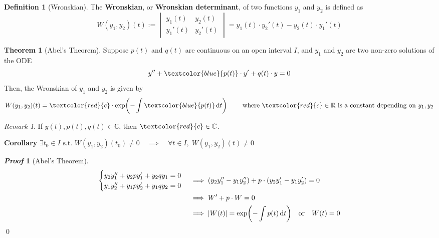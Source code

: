 \documentclass[10pt,UTF8]{article}
\newenvironment{definitionBox}
{
  \begin{tcolorbox}[colback=blue!5!white,colframe=blue!75!black,parbox=false,before
  upper=\par,before lower=\par]}
  {
\end{tcolorbox}}
\newenvironment{theoremBox}
{
  \begin{tcolorbox}[colback=yellow!5!white,colframe=yellow!75!black,parbox=false,before
  upper=\par,before lower=\par]}
  {
\end{tcolorbox}}
\theoremstyle{definition}
\newtheorem{definition inner}{Definition}[section]
\newenvironment{definition}[1][]
{
  \begin{definitionBox}
  \begin{definition inner}[#1]\hfill\par}
    {
    \end{definition inner}
\end{definitionBox}}
\theoremstyle{definition}
\newtheorem{theorem inner}{Theorem}[section]
\newenvironment{theorem}[1][]
{
  \begin{theoremBox}
  \begin{theorem inner}[#1]\hfill\par}
    {
    \end{theorem inner}
\end{theoremBox}}
\theoremstyle{definition}
\newtheorem*{proof inner}{\textit{Proof}}
\renewenvironment{proof}[1][]
{
\begin{proof inner}[#1]\hfill\par}
  {\qed\vphantom{.}
\end{proof inner}}
\theoremstyle{plain}
\newtheorem{tip inner}{Tip}[section]
\theoremstyle{remark}
\newtheorem*{remark}{\textit{Remark}}
\begin{document}
\begin{definition}[Wronskian]
  {}\label{def: Wronskian}
  The \textbf{Wronskian}, or \textbf{Wronskian determinant},
  of two functions \(y_1\) and \(y_2\) is defined as
  \[
    W(y_1,y_2)(t) :=
    \begin{vmatrix}
      y_1(t) & y_2(t) \\
      y_1'(t) & y_2'(t)
    \end{vmatrix} = y_1(t)\cdot y_2'(t) - y_2(t)\cdot y_1'(t)
  \]
\end{definition}

\begin{theorem}[Abel's Theorem]
  {}\label{thm: Abel's Theorem}
  Suppose \(p(t)\) and \(q(t)\) are continuous on an open interval \(I\),
  and \(y_1\) and \(y_2\) are two non-zero solutions of the ODE
  \begin{equation}
    y'' + \textcolor{blue}{p(t)}\cdot y' + q(t)\cdot y = 0
    \label{eq: local.06 ODE}
  \end{equation}
  Then, the Wronskian of \(y_1\) and \(y_2\) is given by
  \begin{equation*}
    W(y_1,y_2)(t) = \textcolor{red}{c} \cdot
    \exp(-\int \textcolor{blue}{p(t)} \dd{t})
    \qquad\text{ where } \textcolor{red}{c} \in \mathbb{R}
    \text{ is a constant depending on } y_1, y_2
  \end{equation*}
\end{theorem}

\begin{remark}
  If \(y(t),p(t),q(t) \in \mathbb{C}\),
  then \(\textcolor{red}{c} \in \mathbb{C}\).
\end{remark}

\begin{theoremBox}\noindent
  \textbf{Corollary}
  {}\label{thm: corollary of Abel's Theorem}
  \qquad\qquad\qquad
  \begin{math}
    \exists t_0 \in I \text{ s.t. } W(y_1,y_2)(t_0) \neq 0
    \quad\implies\quad
    \forall t \in I, \; W(y_1,y_2)(t) \neq 0
  \end{math}
\end{theoremBox}

\begin{proof}[Abel's Theorem]\noindent
  \begin{align*}
    \begin{cases}
      y_2 y_1'' + y_2 p y_1' + y_2 q y_1 = 0 \\
      y_1 y_2'' + y_1 p y_2' + y_1 q y_2 = 0
    \end{cases}
    &\implies
    (y_2 y_1'' - y_1 y_2'') + p \cdot (y_2 y_1' - y_1 y_2') = 0 \\
    &\implies
    W' + p \cdot W = 0 \\
    &\implies
    \abs{W(t)} = \exp(-\int p(t) \dd{t})
    \qor W(t) = 0
  \end{align*}
\end{proof}
\end{document}

